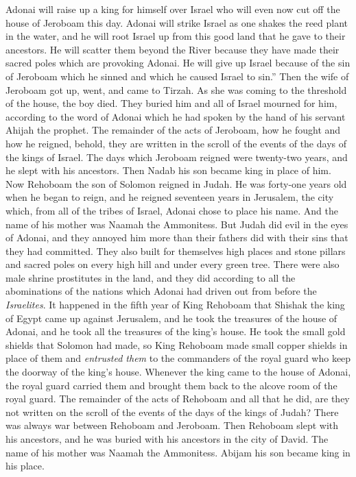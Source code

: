 \begin{biblechapter}
\verse Adonai will raise up a king for himself over Israel who will even now cut off the house of Jeroboam this day.
\verse Adonai will strike Israel as one shakes the reed plant in the water, and he will root Israel up from this good land that he gave to their ancestors. He will scatter them beyond the River because they have made their sacred poles which are provoking Adonai.
\verse He will give up Israel because of the sin of Jeroboam which he sinned and which he caused Israel to sin.”
\verse Then the wife of Jeroboam got up, went, and came to Tirzah. As she was coming to the threshold of the house, the boy died.
\verse They buried him and all of Israel mourned for him, according to the word of Adonai which he had spoken by the hand of his servant Ahijah the prophet.
\verse The remainder of the acts of Jeroboam, how he fought and how he reigned, behold, they are written in the scroll of the events of the days of the kings of Israel.
\verse The days which Jeroboam reigned were twenty-two years, and he slept with his ancestors. Then Nadab his son became king in place of him.
 Now Rehoboam the son of Solomon reigned in Judah. He was forty-one years old when he began to reign, and he reigned seventeen years in Jerusalem, the city which, from all of the tribes of Israel, Adonai chose to place his name. And the name of his mother was Naamah the Ammonitess.
\verse But Judah did evil in the eyes of Adonai, and they annoyed him more than their fathers did with their sins that they had committed.
\verse They also built for themselves high places and stone pillars and sacred poles on every high hill and under every green tree.
\verse There were also male shrine prostitutes in the land, and they did according to all the abominations of the nations which Adonai had driven out from before the \textit{Israelites}.
 It happened in the fifth year of King Rehoboam that Shishak the king of Egypt came up against Jerusalem,
\verse and he took the treasures of the house of Adonai, and he took all the treasures of the king’s house. He took the small gold shields that Solomon had made,
\verse so King Rehoboam made small copper shields in place of them and \textit{entrusted them} to the commanders of the royal guard who keep the doorway of the king’s house.
\verse Whenever the king came to the house of Adonai, the royal guard carried them and brought them back to the alcove room of the royal guard.
\verse The remainder of the acts of Rehoboam and all that he did, are they not written on the scroll of the events of the days of the kings of Judah?
\verse There was always war between Rehoboam and Jeroboam.
\verse Then Rehoboam slept with his ancestors, and he was buried with his ancestors in the city of David. The name of his mother was Naamah the Ammonitess. Abijam his son became king in his place.
\end{biblechapter}

